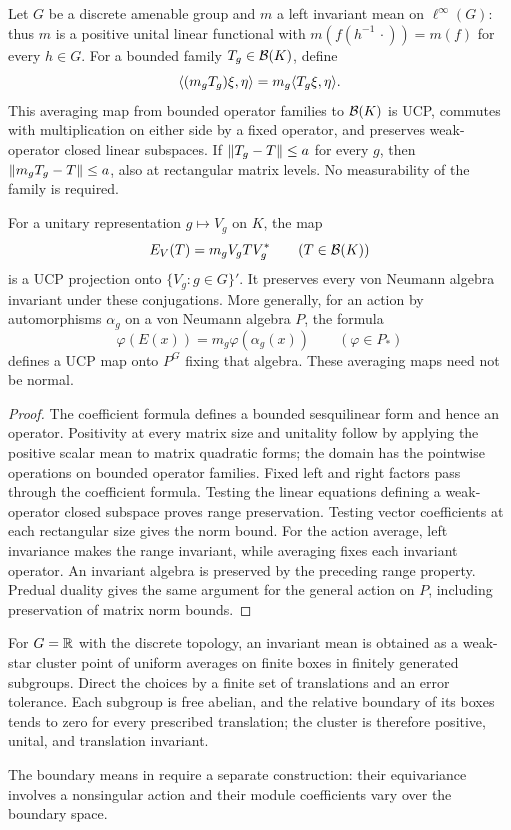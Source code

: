 \begin{lemma}\label{lem:invariant-mean}
Let $G$ be a discrete amenable group and $m$ a left invariant mean on
$\ell^\infty(G)$: thus $m$ is a positive unital linear functional with
$m(f(h^{-1}\,\cdot))=m(f)$ for every $h\in G$.
For a bounded family $T_g\in\mathcal B(K)$, define
\[
 \langle (m_gT_g)\xi,\eta\rangle=m_g\langle T_g\xi,\eta\rangle.
\]
This averaging map from bounded operator families to $\mathcal B(K)$ is UCP,
commutes with multiplication on either side by a fixed operator, and
preserves weak-operator closed linear subspaces. If
$\lVert T_g-T\rVert\le a$ for every $g$, then
$\lVert m_gT_g-T\rVert\le a$, also at rectangular matrix levels.
No measurability of the family is required.

For a unitary representation $g\mapsto V_g$ on $K$, the map
\[
 E_V(T)=m_gV_gTV_g^*\qquad(T\in\mathcal B(K))
\]
is a UCP projection onto $\{V_g:g\in G\}'$. It preserves every von
Neumann algebra invariant under these conjugations.
More generally, for an action by automorphisms $\alpha_g$ on a von
Neumann algebra $P$, the formula
\[
 \varphi(E(x))=m_g\varphi(\alpha_g(x))\qquad(\varphi\in P_*)
\]
defines a UCP map onto $P^G$ fixing that algebra. These averaging maps
need not be normal.
\end{lemma}

\begin{proof}
The coefficient formula defines a bounded sesquilinear form and hence
an operator. Positivity at every matrix size and unitality follow by
applying the positive scalar mean to matrix quadratic forms; the domain
has the pointwise operations on bounded operator families. Fixed left
and right factors pass through the coefficient formula. Testing the
linear equations defining a weak-operator closed subspace proves range
preservation. Testing vector coefficients at each rectangular size
gives the norm bound. For the action average, left invariance makes
the range invariant, while averaging fixes each invariant operator.
An invariant algebra is preserved by the preceding range property.
Predual duality gives the same argument for the general action on $P$,
including preservation of matrix norm bounds.
\end{proof}

For $G=\mathbb R$ with the discrete topology, an invariant mean is obtained
as a weak-star cluster point of uniform averages on finite boxes in
finitely generated subgroups. Direct the choices by a finite set of
translations and an error tolerance. Each subgroup is free abelian,
and the relative boundary of its boxes tends to zero for every
prescribed translation; the cluster is therefore positive, unital,
and translation invariant.

The boundary means in  require a separate
construction: their equivariance involves a nonsingular action and
their module coefficients vary over the boundary space.
